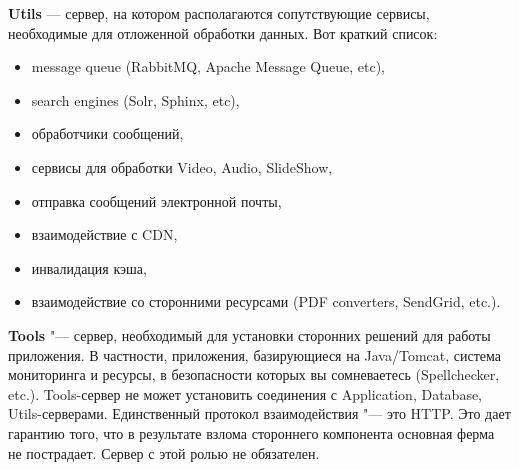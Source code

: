 \documentclass[10pt, a5paper]{article}
\begin{document}
{\bf Utils} --- сервер, на котором располагаются сопутствующие сервисы, необходимые для отложенной обработки данных. Вот краткий список:
\begin{itemize}
\item message queue (RabbitMQ, Apache Message Queue, etc),
\item search engines (Solr, Sphinx, etc),
\item обработчики сообщений,
\item сервисы для обработки Video, Audio, SlideShow,
\item отправка сообщений электронной почты,
\item взаимодействие с CDN,
\item инвалидация кэша,
\item взаимодействие со сторонними ресурсами (PDF converters, \linebreak SendGrid, etc.). 
\end{itemize}
{\bf Tools} "--- сервер, необходимый для установки сторонних решений для работы приложения. В частности, приложения, базирующиеся на Java/Tomcat, система мониторинга и ресурсы, в безопасности которых вы сомневаетесь (Spellchecker, etc.). Tools-сервер не может установить соединения с Application, Database, Utils-серверами. Единственный протокол взаимодействия "--- это HTTP. Это дает гарантию того, что в результате взлома стороннего компонента основная ферма не пострадает. Сервер с этой ролью не обязателен. 


\begin{figure}[ht]
\label{pic:fl1}
\end{figure}
\end{document}
